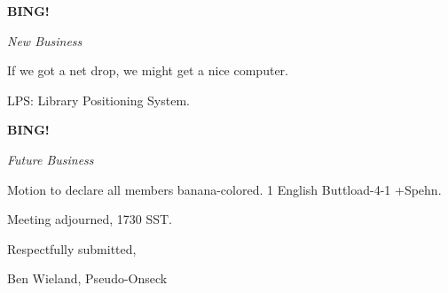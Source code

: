 \documentclass[12pt]{article}
\newcommand{\bing}{{\bf BING!} }
\newcommand{\goto}[1]{\bing \vskip 12pt \centerline{{\em{#1}}}}
\begin{document}
\goto{New Business}

If we got a net drop, we might get a nice computer.

LPS: Library Positioning System.

\goto{Future Business}

Motion to declare all members banana-colored. 1 English Buttload-4-1 +Spehn.

\vspace{12pt}

\noindent
Meeting adjourned, 1730 SST.

\vspace{18pt}

\centerline{Respectfully submitted,}
\centerline{Ben Wieland, Pseudo-Onseck}
\end{document}
